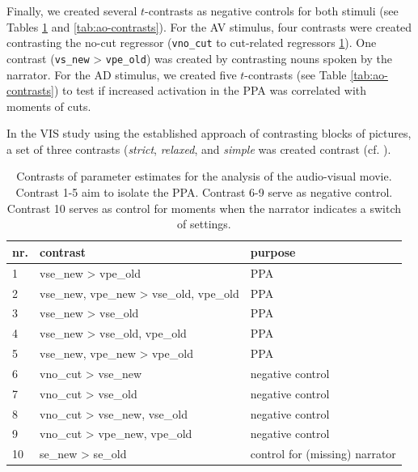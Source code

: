 \documentclass[english]{article}
\begin{document}
Finally, we created several $t$-contrasts as negative controls for both stimuli
(see Tables \ref{tab:av-contrasts} and \ref{tab:ao-contrasts}).
For the AV stimulus, four contrasts were created contrasting the no-cut
regressor (\texttt{vno\_cut} to cut-related regressors \ref{tab:av-contrasts}).
One contrast (\texttt{vs\_new} > \texttt{vpe\_old}) was created by contrasting
nouns spoken by the narrator.
For the AD stimulus, we created five $t$-contrasts (see Table
\ref{tab:ao-contrasts}) to test if increased activation in the PPA was
correlated with moments of cuts.

In the VIS study using the established approach of contrasting blocks of
pictures, a set of three contrasts (\textit{strict}, \textit{relaxed}, and
\textit{simple} was created contrast (cf. \citep{sengupta2016extension}).


\begin{table}[h!]
\caption{Contrasts of parameter estimates for the analysis of the
    audio-visual movie.
    Contrast 1-5 aim to isolate the PPA.
    Contrast 6-9 serve as negative control.
    Contrast 10 serves as control for moments when the narrator indicates
    a switch of settings.}
\label{tab:av-contrasts}
\footnotesize
\begin{tabular}{lll}
\toprule
\textbf{nr.} &  \textbf{contrast} & \textbf{purpose} \\
\midrule
1 & vse\_new > vpe\_old & PPA \tabularnewline
2 & vse\_new, vpe\_new > vse\_old, vpe\_old & PPA \tabularnewline
3 & vse\_new > vse\_old & PPA \tabularnewline
4 & vse\_new > vse\_old, vpe\_old & PPA \tabularnewline
5 & vse\_new, vpe\_new > vpe\_old & PPA \tabularnewline
6 & vno\_cut > vse\_new & negative control \tabularnewline
7 & vno\_cut > vse\_old & negative control \tabularnewline
8 & vno\_cut > vse\_new, vse\_old & negative control \tabularnewline
9 & vno\_cut > vpe\_new, vpe\_old & negative control \tabularnewline
10 & se\_new > se\_old & control for (missing) narrator \tabularnewline
\end{tabular}
\end{table}
\end{document}
